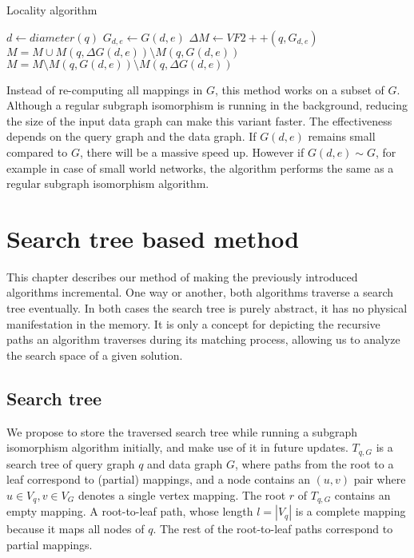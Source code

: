 
\begin{algorithm}
\caption{Locality algorithm}\label{alg:two}
$d \gets diameter(q)$\;
$G_{d, e} \gets G(d, e)$\;
$\Delta M \gets VF2++(q, G_{d, e})$\;
$M = M \cup M(q, \Delta G(d, e)) \setminus M(q, G(d, e))$\;
$M = M \setminus M(q, G(d, e)) \setminus M(q, \Delta G(d, e))$\;
\end{algorithm}

Instead of re-computing all mappings in $G$, this method works on a subset of $G$.
Although a regular subgraph isomorphism is running in the background, reducing the
size of the input data graph can make this variant faster. The effectiveness depends
on the query graph and the data graph. If $G(d, e)$ remains small compared to $G$,
there will be a massive speed up. However if $G(d, e) \sim G$, for example in case of
small world networks, the algorithm performs the same as a regular subgraph isomorphism
algorithm.


\section{Search tree based method}

This chapter describes our method of making the previously introduced algorithms
incremental. One way or another, both algorithms traverse a search tree eventually.
In both cases the search tree is purely abstract, it has no physical manifestation
in the memory. It is only a concept for depicting the recursive paths an algorithm
traverses during its matching process, allowing us to analyze the search space of a
given solution.

\subsection{Search tree}

We propose to store the traversed search tree while running a subgraph isomorphism 
algorithm initially, and make use of it in future updates. $T_{q, G}$ is a search 
tree of query graph $q$ and data graph $G$, where paths from the root to a leaf 
correspond to (partial) mappings, and a node contains an $(u, v)$ pair where 
$u \in V_q, v \in V_G$ denotes a single vertex mapping. The root $r$ of $T_{q, G}$
contains an empty mapping. A root-to-leaf path, whose length $l = |V_q|$ is a complete
mapping because it maps all nodes of $q$. The rest of the root-to-leaf paths correspond
to partial mappings.

